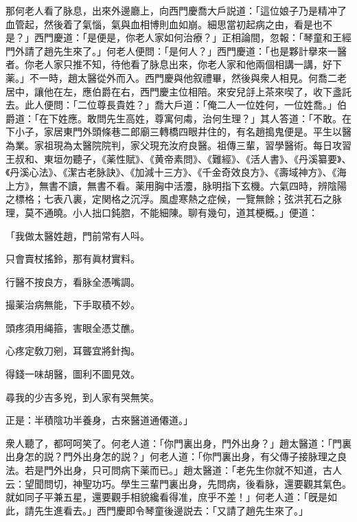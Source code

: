 那何老人看了脉息，出來外邊廳上，向西門慶喬大戶説道：「這位娘子乃是精冲了血管起，然後着了氣惱，氣與血相博則血如崩。細思當初起病之由，看是也不是？」西門慶道：「是便是，你老人家如何治療？」正相論間，忽報：「琴童和王經門外請了趙先生來了。」何老人便問：「是何人？」西門慶道：「也是夥計擧來一醫者。你老人家只推不知，待他看了脉息出來，你老人家和他兩個相講一講，好下薬。」不一時，趙太醫從外而入。西門慶與他叙禮畢，然後與衆人相見。何喬二老居中，讓他在左，應伯爵在右，西門慶主位相陪。來安兒㧱上茶來喫了，收下盞託去。此人便問：「二位尊長貴姓？」喬大戶道：「俺二人一位姓何，一位姓喬。」伯爵道：「在下姓應。敢問先生高姓，尊寓何䖏，治何生理？」其人答道：「不敢。在下小子，家居東門外頭條巷二郎廟三轉橋四眼井住的，有名趙搗鬼便是。平生以醫為業。家祖現為太醫院院判，家父現充汝府良醫。祖傳三輩，習學醫術。每日攻習王叔和、東垣勿聽子，《薬性賦》、《黄帝素問》、《難經》、《活人書》、《丹溪纂要》、《丹溪心法》、《潔古老脉訣》、《加減十三方》、《千金奇效良方》、《壽域神方》、《海上方》，無書不讀，無書不看。薬用胸中活灋，脉明指下玄機。六氣四時，辨陰陽之標格；七表八裏，定関格之沉浮。風虚寒熱之症候，一覽無餘；弦洪芤石之脉理，莫不通曉。小人拙口鈍脗，不能細陳。聊有幾句，道其梗概。」便道：

\begin{myquote}
「我做太醫姓趙，門前常有人呌。

只會賣杖搖鈴，那有眞材實料。　

行醫不按良方，看脉全憑嘴調。

撮薬治病無能，下手取積不妙。

頭疼須用䋲箍，害眼全憑艾醮。

心疼定敎刀剜，耳聾宜將針掏。

得錢一味胡醫，圖利不圖見效。

尋我的少吉多兇，到人家有哭無笑。

正是：半積陰功半養身，古來醫道通僊道。」
\end{myquote}

衆人聽了，都呵呵笑了。何老人道：「你門裏出身，門外出身？」趙太醫道：「門裏出身怎的説？門外出身怎的説？」何老人道：「你門裏出身，有父傳子接脉理之良法。若是門外出身，只可問病下薬而已。」趙太醫道：「老先生你就不知道，古人云：望聞問切，神聖功巧。學生三輩門裏出身，先問病，後看脉，還要觀其氣色。就如同子平兼五星，還要觀手相貌纔看得准，庶乎不差！」何老人道：「旣是如此，請先生進看去。」西門慶即令琴童後邊説去：「又請了趙先生來了。」

